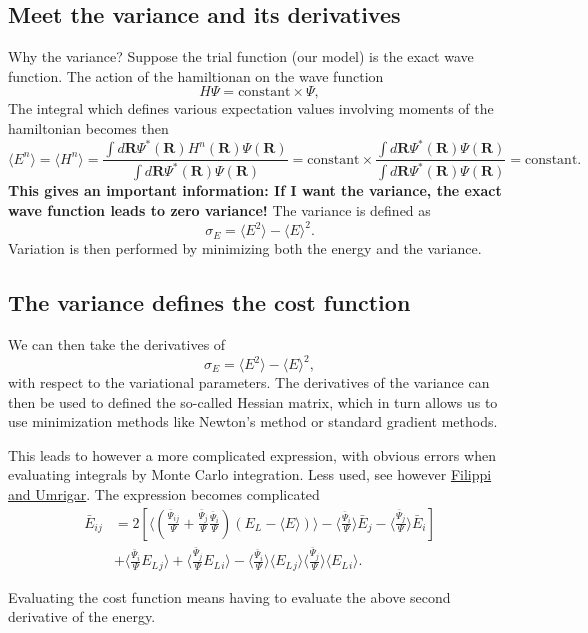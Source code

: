\documentclass[%
oneside,                 %
final,                   %
10pt]{article}
\begin{document}
\subsection{Meet the variance and its derivatives}
\begin{block}{Why the variance? }
Suppose the trial function (our model) is the exact wave function. The action of the hamiltionan
on the wave function
\[
   H\Psi = \mathrm{constant}\times \Psi,
\]
The integral which defines various 
expectation values involving moments of the hamiltonian becomes then
\[
   \langle E^n \rangle =   \langle H^n \rangle =
   \frac{\int d\bm{R}\Psi^{\ast}(\bm{R})H^n(\bm{R})\Psi(\bm{R})}
        {\int d\bm{R}\Psi^{\ast}(\bm{R})\Psi(\bm{R})}=
\mathrm{constant}\times\frac{\int d\bm{R}\Psi^{\ast}(\bm{R})\Psi(\bm{R})}
        {\int d\bm{R}\Psi^{\ast}(\bm{R})\Psi(\bm{R})}=\mathrm{constant}.
\]
\textbf{This gives an important information: If I want the variance, the exact wave function leads to zero variance!}
The variance is defined as 
\[
\sigma_E = \langle E^2\rangle - \langle E\rangle^2.
\]
Variation is then performed by minimizing both the energy and the variance.

\end{block}

\subsection{The variance defines the cost function}
\begin{block}{}
We can then take the derivatives of 
\[
\sigma_E = \langle E^2\rangle - \langle E\rangle^2,
\]
with respect to the variational parameters. The derivatives of the variance can then be used to defined the
so-called Hessian matrix, which in turn allows us to use minimization methods like Newton's method or 
standard gradient methods. 

This leads to however a more complicated expression, with obvious errors when evaluating integrals by Monte Carlo integration. Less used, see however \href{{https://journals.aps.org/prl/abstract/10.1103/PhysRevLett.94.150201}}{Filippi and Umrigar}. The expression becomes complicated
\begin{align}
\bar{E}_{ij} &= 2\left[ \langle (\frac{\bar{\Psi}_{ij}}{\Psi}+\frac{\bar{\Psi}_{j}}{\Psi}\frac{\bar{\Psi}_{i}}{\Psi})(E_L-\langle E\rangle)\rangle -\langle \frac{\bar{\Psi}_{i}}{\Psi}\rangle\bar{E}_j-\langle \frac{\bar{\Psi}_{j}}{\Psi}\rangle\bar{E}_i\right] \\ \nonumber
&+\langle \frac{\bar{\Psi}_{i}}{\Psi}E_L{_j}\rangle +\langle \frac{\bar{\Psi}_{j}}{\Psi}E_L{_i}\rangle -\langle \frac{\bar{\Psi}_{i}}{\Psi}\rangle\langle E_L{_j}\rangle \langle \frac{\bar{\Psi}_{j}}{\Psi}\rangle\langle E_L{_i}\rangle.  
\end{align}

Evaluating the cost function means having to evaluate the above second derivative of the energy. 

\end{block}



\end{document}
